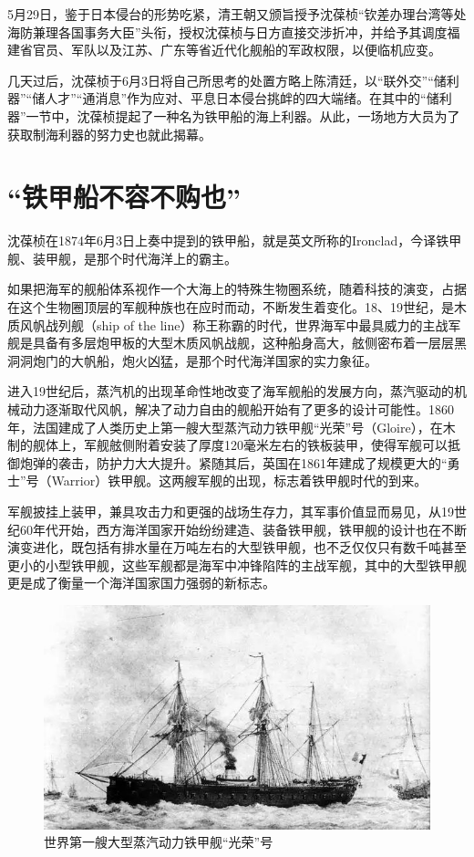\documentclass[12pt,UTF8]{ctexbook}
\begin{document}
5月29日，鉴于日本侵台的形势吃紧，清王朝又颁旨授予沈葆桢“钦差办理台湾等处海防兼理各国事务大臣”头衔，授权沈葆桢与日方直接交涉折冲，并给予其调度福建省官员、军队以及江苏、广东等省近代化舰船的军政权限，以便临机应变。

几天过后，沈葆桢于6月3日将自己所思考的处置方略上陈清廷，以“联外交”“储利器”“储人才”“通消息”作为应对、平息日本侵台挑衅的四大端绪。在其中的“储利器”一节中，沈葆桢提起了一种名为铁甲船的海上利器。从此，一场地方大员为了获取制海利器的努力史也就此揭幕。

\section{“铁甲船不容不购也”}

沈葆桢在1874年6月3日上奏中提到的铁甲船，就是英文所称的Ironclad，今译铁甲舰、装甲舰，是那个时代海洋上的霸主。

如果把海军的舰船体系视作一个大海上的特殊生物圈系统，随着科技的演变，占据在这个生物圈顶层的军舰种族也在应时而动，不断发生着变化。18、19世纪，是木质风帆战列舰（ship of the line）称王称霸的时代，世界海军中最具威力的主战军舰是具备有多层炮甲板的大型木质风帆战舰，这种船身高大，舷侧密布着一层层黑洞洞炮门的大帆船，炮火凶猛，是那个时代海洋国家的实力象征。

进入19世纪后，蒸汽机的出现革命性地改变了海军舰船的发展方向，蒸汽驱动的机械动力逐渐取代风帆，解决了动力自由的舰船开始有了更多的设计可能性。1860年，法国建成了人类历史上第一艘大型蒸汽动力铁甲舰“光荣”号（Gloire），在木制的舰体上，军舰舷侧附着安装了厚度120毫米左右的铁板装甲，使得军舰可以抵御炮弹的袭击，防护力大大提升。紧随其后，英国在1861年建成了规模更大的“勇士”号（Warrior）铁甲舰。这两艘军舰的出现，标志着铁甲舰时代的到来。

军舰披挂上装甲，兼具攻击力和更强的战场生存力，其军事价值显而易见，从19世纪60年代开始，西方海洋国家开始纷纷建造、装备铁甲舰，铁甲舰的设计也在不断演变进化，既包括有排水量在万吨左右的大型铁甲舰，也不乏仅仅只有数千吨甚至更小的小型铁甲舰，这些军舰都是海军中冲锋陷阵的主战军舰，其中的大型铁甲舰更是成了衡量一个海洋国家国力强弱的新标志。

\begin{figure}[htbp]
	\centering
	\includegraphics[width=1\linewidth]{Images/41}
	\caption{世界第一艘大型蒸汽动力铁甲舰“光荣”号}
	\label{fig:1}
\end{figure}
\end{document}
